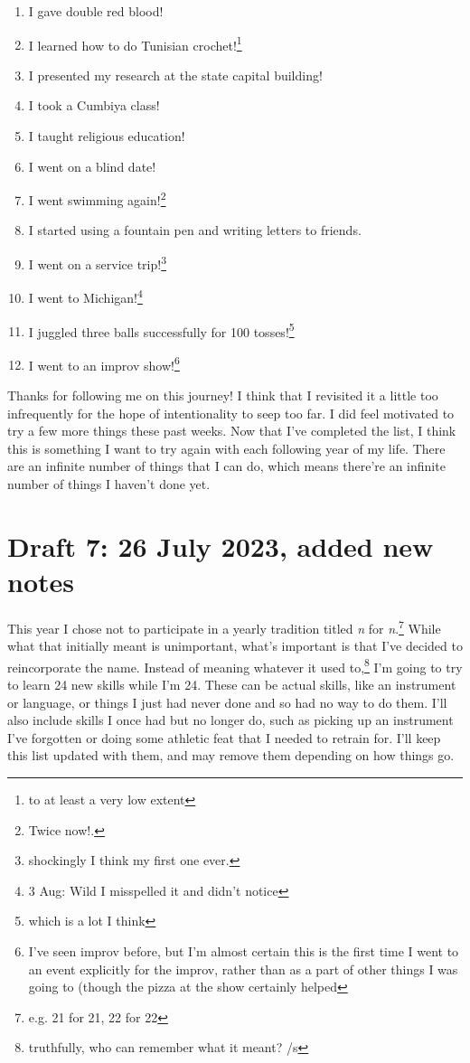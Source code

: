 \documentclass[12pt]{article}[titlepage]
\newcommand{\1}{\={a}}
\newcommand{\2}{\={e}}
\newcommand{\3}{\={\i}}
\newcommand{\4}{\=o}
\newcommand{\5}{\=u}
\newcommand{\6}{\={A}}
\renewcommand{\,}{\textsuperscript{,}}
\begin{document}
\begin{enumerate}
\item I gave double red blood!
\item I learned how to do Tunisian crochet!\footnote{to at least a very low extent}
\item I presented my research at the state capital building!
\item I took a Cumbiya class!
\item I taught religious education!
\item I went on a blind date!
\item I went swimming again!\footnote{Twice now!.}
\item I started using a fountain pen and writing letters to friends.
\item I went on a service trip!\footnote{shockingly I think my first one ever.}
\item I went to Michigan!\footnote{3 Aug: Wild I misspelled it and didn't notice}
\item I juggled three balls successfully for 100 tosses!\footnote{which is a lot I think}
\item I went to an improv show!\footnote{I've seen improv before, but I'm almost certain this is the first time I went to an event explicitly for the improv, rather than as a part of other things I was going to (though the pizza at the show certainly helped}
\end{enumerate}

Thanks for following me on this journey!
I think that I revisited it a little too infrequently for the hope of intentionality to seep too far.
I did feel motivated to try a few more things these past weeks.
Now that I've completed the list, I think this is something I want to try again with each following year of my life.
There are an infinite number of things that I can do, which means there're an infinite number of things I haven't done yet.

\section{Draft 7: 26 July 2023, added new notes }
This year I chose not to participate in a yearly tradition titled \textit{n} for \textit{n}.\footnote{e.g. 21 for 21, 22 for 22}
While what that initially meant is unimportant, what's important is that I've decided to reincorporate the name.
Instead of meaning whatever it used to,\footnote{truthfully, who can remember what it meant? /s} I'm going to try to learn 24 new skills while I'm 24.
These can be actual skills, like an instrument or language, or things I just had never done and so had no way to do them.
I'll also include skills I once had but no longer do, such as picking up an instrument I've forgotten or doing some athletic feat that I needed to retrain for.
I'll keep this list updated with them, and may remove them depending on how things go.
\end{document}
